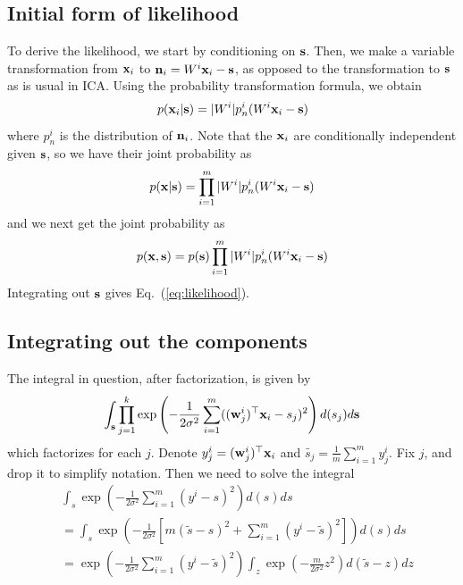 \documentclass[12pt]{report}
\begin{document}
\subsection{Initial form of likelihood}\label{sec:appendix:likelihood_transform}

To derive the likelihood, we start by conditioning on $\mathbf{s}$. Then, we make a variable transformation from $\mathbf{x}_i$ to $\mathbf{n}_i=W^i\mathbf{x}_i-\mathbf{s}$, as opposed to the transformation to $\mathbf{s}$ as is usual in ICA. Using the probability transformation formula, we obtain
\begin{equation}
p(\mathbf{x}_i|\mathbf{s})=|W^i|p^i_n(W^i\mathbf{x}_i-\mathbf{s})    
\end{equation}
where $p^i_n$ is the distribution of $\mathbf{n}_i$. Note that the $\mathbf{x}_i$ are conditionally independent given $\mathbf{s}$, so we have their joint probability as
\begin{equation}
    p(\mathbf{x}|\mathbf{s})=\prod_{i=1}^m  |W^i| p^i_n(W^i\mathbf{x}_i-\mathbf{s})
\end{equation}
and we next get the joint probability as
\begin{equation}
    p(\mathbf{x},\mathbf{s})=p(\mathbf{s}) \prod_{i=1}^m  |W^i| p^i_n(W^i\mathbf{x}_i-\mathbf{s})
\end{equation}
Integrating out $\mathbf{s}$ gives Eq.~(\ref{eq:likelihood}).


\subsection{Integrating out the components}\label{sec:appendix:integration}

The integral in question, after factorization, is given by
\begin{equation}
\int_{\mathbf{s}} \prod_{j=1}^k \exp \left( -\frac{1}{2\sigma^2} \sum_{i=1}^m ((\mathbf{w}_j^i)^{\top}\mathbf{x}_i-s_j)^2 \right) d(s_j) d\mathbf{s}
\end{equation}
which factorizes for each $j$. Denote $y^i_j=(\mathbf{w}_j^i)^{\top}\mathbf{x}_i$ and $\tilde{s_j}=\frac1m\sum_{i=1}^m y^i_j$.  Fix $j$, and drop it to simplify notation. Then we need to solve the integral
\begin{align*}
   &\int_s \exp \left(-\frac{1}{2\sigma^2} \sum_{i=1}^m (y^i-s)^2 \right) d(s)ds\\
   &=\int_s \exp \left(-\frac{1}{2\sigma^2} [ m(\tilde{s}-s)^2 + \sum_{i=1}^m (y^i-\tilde{s})^2] \right) d(s)ds \\ 
&= \exp \left(-\frac{1}{2\sigma^2}\sum_{i=1}^m (y^i-\tilde{s})^2 \right) 
\int_z \exp \left(-\frac{m}{2\sigma^2} z^2 \right) d(\tilde{s}-z) dz
\end{align*}
\end{document}
